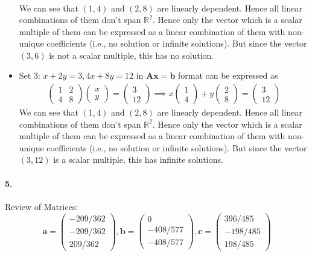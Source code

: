 \documentclass[12pt, letterpaper]{article}
\begin{document}
\begin{itemize}
\[\begin{split}
\end{split}\]
We can see that $(1,4)$ and $(2,8)$ are linearly dependent. Hence all linear combinations of them don't span $\mathbb{R}^2$. Hence only the vector which is a scalar multiple of them can be expressed as a linear combination of them with non-unique coefficients (i.e., no solution or infinite solutions). But since the vector $(3,6)$ is not a scalar multiple, this has no solution.
\item Set 3: $x + 2y = 3, 4x + 8y = 12$ in $\mathbf{Ax} = \mathbf{b}$ format can be expressed as
\[\begin{split}
  \begin{pmatrix}1&2\\4&8\end{pmatrix} \begin{pmatrix}x\\y\end{pmatrix}
  = \begin{pmatrix}3\\12\end{pmatrix}
  \implies x\begin{pmatrix}1\\4\end{pmatrix} + y \begin{pmatrix}2\\8\end{pmatrix}
  = \begin{pmatrix}3\\12\end{pmatrix}
\end{split}\]
We can see that $(1,4)$ and $(2,8)$ are linearly dependent. Hence all linear combinations of them don't span $\mathbb{R}^2$. Hence only the vector which is a scalar multiple of them can be expressed as a linear combination of them with non-unique coefficients (i.e., no solution or infinite solutions). But since the vector $(3,12)$ is a scalar multiple, this has infinite solutions.
\end{itemize}

\pagebreak
\paragraph{5.} Review of Matrices:
\[
\mathbf{a} = \begin{pmatrix} -209/362\\-209/362\\209/362 \end{pmatrix},
\mathbf{b} = \begin{pmatrix} 0\\-408/577\\-408/577 \end{pmatrix},
\mathbf{c} = \begin{pmatrix} 396/485\\-198/485\\198/485 \end{pmatrix}
\]
\end{document}
